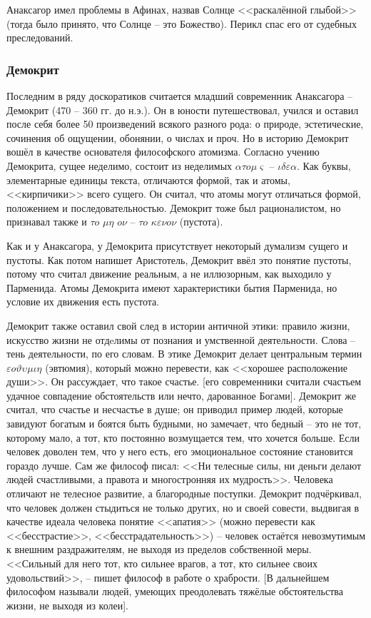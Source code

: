 \documentclass[a4paper, 12pt]{book} %
\begin{document}
Анаксагор имел проблемы в Афинах, назвав Солнце <<раскалённой глыбой>> (тогда было принято, что Солнце -- это Божество). Перикл спас его от судебных преследований. 

\subsubsection{Демокрит}
Последним в ряду доскоратиков считается младший современник Анаксагора -- Демокрит (470 -- 360 гг. до н.э.). Он в юности путешествовал, учился и оставил после себя более 50 произведений всякого разного рода: о природе, эстетические, сочинения об ощущении, обонянии, о числах и проч. Но в историю Демокрит вошёл в качестве основателя философского атомизма. Согласно учению Демокрита, сущее неделимо, состоит из неделимых $ \alpha \tau o \mu \varsigma $ -- $ \iota \delta \varepsilon \alpha $. Как буквы, элементарные единицы текста, отличаются формой, так и атомы, <<кирпичики>> всего сущего. Он считал, что атомы могут отличаться формой, положением и последовательностью. Демокрит тоже был рационалистом, но признавал также и $\tau o $ $\mu \eta $ $o \nu$ -- $\tau o $ $\kappa \varepsilon \nu o \nu$ (пустота).

Как и у Анаксагора, у Демокрита присутствует некоторый думализм сущего и пустоты. Как потом напишет Аристотель, Демокрит ввёл это понятие пустоты, потому что считал движение реальным,  а не иллюзорным, как выходило у Парменида. Атомы Демокрита имеют характеристики бытия Парменида, но условие их движения есть пустота.

Демокрит также оставил свой след в истории античной этики: правило жизни, искусство жизни не отдeлимы от познания и умственной деятельности. Слова -- тень деятельности, по его словам. В этике Демокрит делает центральным термин $\varepsilon o \vartheta \upsilon \mu \iota \eta$ (эвтюмия), который можно перевести, как <<хорошее расположение души>>. Он рассуждает, что такое счастье. [его современники считали счастьем удачное совпадение обстоятельств или нечто, дарованное Богами]. Демокрит же считал, что счастье и несчастье в душе; он приводил пример людей, которые завидуют богатым и боятся быть будными, но замечает, что бедный -- это не тот, которому мало, а тот, кто постоянно возмущается тем, что хочется больше. Если человек доволен тем, что у него есть, его эмоциональное состояние становится гораздо лучше. Сам же философ писал: <<Ни телесные силы, ни деньги делают людей счастливыми, а правота и многостронняя их мудрость>>. Человека отличают не телесное развитие, а благородные поступки. Демокрит подчёркивал, что человек должен стыдиться не только других, но и своей совести, выдвигая в качестве идеала человека понятие <<апатия>> (можно перевести как <<бесстрастие>>, <<бесстрадательность>>) -- человек остаётся невозмутимым к внешним раздражителям, не выходя из пределов собственной меры. <<Сильный для него тот, кто сильнее врагов, а тот, кто сильнее своих удовольствий>>, -- пишет философ в работе о храбрости. [В дальнейшем философом называли людей, умеющих преодолевать тяжёлые обстоятельства жизни, не выходя из колеи].
\end{document}
